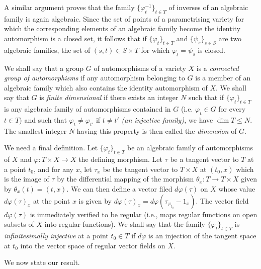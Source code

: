 A similar argument proves that the family $\{\varphi^{-1}_t\}_{t \in T}$ of inverses of an algebraic family is again algebraic. Since the set of points of a parametrising variety for which the corresponding elements of an algebraic family become the identity automorphism is a closed set, it follows that if $\{\varphi_t\}_{t\in T}$ and $\{\psi_s\}_{s \in S}$ are two algebraic families, the set of $(s,t) \in S \times T$ for which $\varphi_t = \psi_s$ is closed. 

We shall say that a group $G$ of automorphisms of a variety $X$ is a {\em connected group of automorphisms} if any automorphism belonging to $G$ is a member of an algebraic family which also contains the identity automorphism of $X$. We shall say that $G$ is {\em finite dimensional} if there exists an integer $N$ such that if $\{\varphi_t\}_{t \in T}$ is any algebraic family of automorphisms contained in $G$ (i.e. $\varphi_t \in G$ for every $t \in T$) and such that $\varphi_t \neq \varphi_{t'}$ if $t \neq t'$ {\em (an injective family),} we have $\dim T \leq N$. The smallest integer $N$ having this property is then called the {\em dimension} of $G$.

We need a final definition. Let $\{\varphi_t\}_{t\in T}$ be an algebraic family of automorphisms of $X$ and $\varphi: T \times X \to X$ the defining morphism. Let $\tau$ be a tangent vector to $T$ at a point $t_0$, and for any $x$, let $\tau_x$ be the tangent vector to $T \times X$ at $(t_0, x)$ which is the image of $\tau$ by the differential mapping of the morphism $\theta_x : T \to T \times X$ given by $\theta_x (t) = (t,x)$. We can then define a vector filed $d \varphi (\tau)$ on $X$ whose value $d \varphi (\tau)_x$ at the point $x$ is given by $d \varphi (\tau)_x = d \varphi (\tau_{\varphi_{t_0}} - 1_x)$. The vector field $d \varphi (\tau)$ is immediately verified to be regular (i.e., maps regular functions on open subsets of $X$ into regular functions). We shall say that the family $\{\varphi_t\}_{t \in T}$ is {\em infinitesimally injective } at a point $t_0 \in T$ if $d \varphi$ is an injection of the tangent space at $t_0$ into the vector space of regular vector fields on $X$. 

We now state our result.

